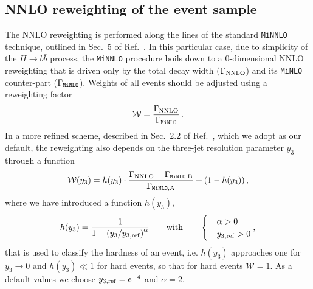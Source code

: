 \documentclass[11pt,a4paper]{article}\pdfoutput=1
\newcommand{\MINLO}{{\tt{MiNLO}}}
\newcommand{\MINNLO}{{\tt{MiNNLO}}}
\newcommand{\Hbb}[1]{\ensuremath{H\to b\bar{b}{#1}}}
\begin{document}
\subsection{NNLO reweighting of the event sample}
\label{sec:nnlo-rwgt}
The NNLO reweighting is performed along the lines of the standard
\MINNLO{} technique, outlined in Sec.~5 of
Ref.~\cite{Hamilton:2012rf}.
%
In this particular case, due to simplicity of the \Hbb{} process, the
\MINNLO{} procedure boils down to a 0-dimensional NNLO reweighting that
is driven only by the total decay width ($\Gamma_{\rm{NNLO}}$) and its
\MINLO{} counter-part ($\Gamma_{\MINLO{}}$). Weights of all events
should be adjusted using a reweighting factor
\begin{align}
  \mathcal{W} = \frac{\Gamma_{\rm{NNLO}}}{\Gamma_{\MINLO{}}}\,.
\end{align}
%
In a more refined scheme, described in Sec.~2.2 of
Ref.~\cite{hbbg-paper}, which we adopt as our default,
the reweighting also depends on the three-jet
resolution parameter $y_3$ through a function
\begin{align}
  \mathcal{W}(y_3) =
  h(y_3) \cdot
  \frac{ \Gamma_{\rm{NNLO}} - \Gamma_{\MINLO{},\rm{B}} }{ \Gamma_{\MINLO{},\rm{A}} }
  +
  \left(  1 - h(y_3) \right),
\end{align}
where we have introduced a function $h(y_3)$,
\begin{align}
  \label{eq:hval}
  h(y_3) = \frac{1}{1 + \left(y_3 / y_{3,\rm{ref}}\right)^{\alpha} }
  \qquad\rm{with}\qquad
  \begin{cases}
    &\alpha > 0 \\
    &y_{3,\rm{ref}} > 0
    \end{cases},
\end{align}
that is used to classify the hardness of an event, i.e. $h(y_3)$
approaches one for $y_3\to 0$ and $h(y_3)\ll 1$ for hard events, so that for hard events
$\mathcal{W} = 1$. As a
default values we choose $y_{3,\rm{ref}} = e^{-4}$ and $\alpha = 2$.
\end{document}
